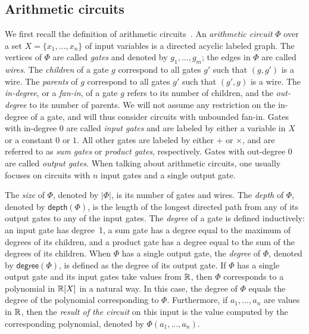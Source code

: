 \subsection{Arithmetic circuits}\label{subsect:ac}
We first recall the definition of arithmetic circuits~\cite{allender}. 
An \textit{arithmetic circuit} $\Phi$ over a set $X=\{x_1,\ldots,x_n\}$ of input variables is a directed
acyclic labeled graph. The vertices of $\Phi$ are called \textit{gates} and denoted by $g_1,\ldots,g_m$;
the edges in $\Phi$ are called \textit{wires}. The \textit{children} of a gate $g$ correspond to all gates
$g'$ such that $(g,g')$ is a wire. The \textit{parents} of $g$ correspond to all gates $g'$ 
such that $(g',g)$ is a wire. The \textit{in-degree}, or a \textit{fan-in}, of a gate $g$ refers to its number of 
children, and 
the \textit{out-degree} to its number of parents. We will not assume any restriction on the in-degree of a gate, and will thus consider circuits with unbounded fan-in. Gates with in-degree $0$ are called \textit{input gates}
and are labeled by either a variable in $X$ or a constant $0$ or $1$. All other gates
are labeled by either $+$ or $\times$, and are referred to as \textit{sum gates} or \textit{product gates}, respectively.
Gates with out-degree $0$ are called \textit{output gates}. When talking about arithmetic circuits, one usually focuses on circuits with $n$ input gates and a single output gate.

The \textit{size} of $\Phi$, denoted by $|\Phi|$, is its number of gates and wires. The \textit{depth} of $\Phi$, denoted
by $\mathsf{depth}(\Phi)$, is the length of the longest directed path from any of its output gates to any of the input gates. The \textit{degree} of a gate is defined inductively: an input gate has degree~1, a sum gate has a degree equal to the maximum of degrees of its children, and a product gate has a degree equal to the sum of the degrees of its children. When $\Phi$ has a single output gate, the \textit{degree} of $\Phi$, denoted by $\mathsf{degree}(\Phi)$, is defined as the degree of its output gate. If $\Phi$ has a single output gate and its input gates take values from $\mathbb{R}$, then $\Phi$ corresponds to a polynomial in $\mathbb{R}[X]$ in a natural way. In this case, the {degree} of $\Phi$ equals the degree of the polynomial corresponding to $\Phi$. Furthermore, if $a_1,\ldots ,a_n$ are values in $\mathbb{R}$, then 
the \textit{result of the circuit} on this input is the value computed by the corresponding polynomial, denoted by $\Phi(a_1,\ldots ,a_n)$.

